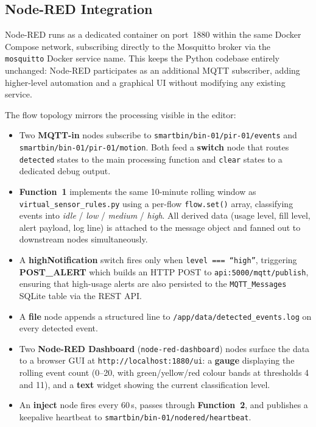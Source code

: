 \documentclass[10pt,a4paper]{article}
\begin{document}
\subsection{Node-RED Integration}

Node-RED runs as a dedicated container on port~1880 within the same Docker Compose network, subscribing directly to the Mosquitto broker via the \texttt{mosquitto} Docker service name. This keeps the Python codebase entirely unchanged: Node-RED participates as an additional MQTT subscriber, adding higher-level automation and a graphical UI without modifying any existing service.

The flow topology mirrors the processing visible in the editor:

\begin{itemize}
\item Two \textbf{MQTT-in} nodes subscribe to \texttt{smartbin/bin-01/pir-01/events} and \texttt{smartbin/bin-01/pir-01/motion}. Both feed a \textbf{switch} node that routes \texttt{detected} states to the main processing function and \texttt{clear} states to a dedicated debug output.
\item \textbf{Function~1} implements the same 10-minute rolling window as \texttt{virtual\_sensor\_rules.py} using a per-flow \texttt{flow.set()} array, classifying events into \textit{idle} / \textit{low} / \textit{medium} / \textit{high}. All derived data (usage level, fill level, alert payload, log line) is attached to the message object and fanned out to downstream nodes simultaneously.
\item A \textbf{highNotification} switch fires only when \texttt{level === ``high''}, triggering \textbf{POST\_ALERT} which builds an HTTP POST to \texttt{api:5000/mqtt/publish}, ensuring that high-usage alerts are also persisted to the \texttt{MQTT\_Messages} SQLite table via the REST API.
\item A \textbf{file} node appends a structured line to \texttt{/app/data/detected\_events.log} on every detected event.
\item Two \textbf{Node-RED Dashboard} (\texttt{node-red-dashboard}) nodes surface the data to a browser GUI at \texttt{http://localhost:1880/ui}: a \textbf{gauge} displaying the rolling event count (0--20, with green/yellow/red colour bands at thresholds 4 and 11), and a \textbf{text} widget showing the current classification level.
\item An \textbf{inject} node fires every 60\,s, passes through \textbf{Function~2}, and publishes a keepalive heartbeat to \texttt{smartbin/bin-01/nodered/heartbeat}.
\end{itemize}
\end{document}
